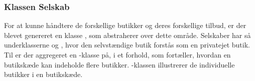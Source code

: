\subsubsection{Klassen Selskab}
For at kunne håndtere de forskellige butikker og deres forskellige tilbud, er der blevet genereret en klasse , som abstraherer over dette område. Selskaber har så underklasserne  og , hvor den selvstændige butik forstås som en privatejet butik.
Til  er der aggregeret en -klasse på, i et forhold, som fortæller, hvordan en butikskæde kan indeholde flere butikker. -klassen illustrerer de individuelle butikker i en butikskæde.